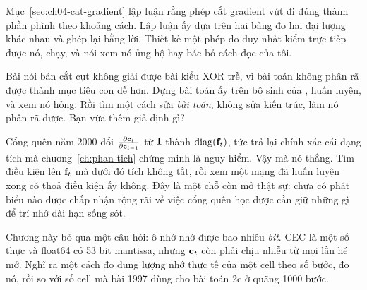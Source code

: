 \tierextend

\begin{bt}
  \item Mục~\ref{sec:ch04-cat-gradient} lập luận rằng phép cắt gradient vứt đi
    đúng thành phần phình theo khoảng cách. Lập luận ấy dựa trên hai bảng đo hai
    đại lượng khác nhau và ghép lại bằng lời. Thiết kế một phép đo duy nhất
    kiểm trực tiếp được nó, chạy, và nói xem nó ủng hộ hay bác bỏ cách đọc của
    tôi.

  \item Bài nói bản cắt cụt không giải được bài kiểu XOR trễ, vì bài toán không
    phân rã được thành mục tiêu con dễ hơn. Dựng bài toán ấy trên bộ sinh của
    , huấn luyện, và xem nó hỏng. Rồi tìm một cách sửa
    \emph{bài toán}, không sửa kiến trúc, làm nó phân rã được. Bạn vừa thêm giả
    định gì?

  \item Cổng quên năm 2000 đổi \(\frac{\partial \mathbf{c}_t}{\partial \mathbf{c}_{t-1}}\) từ
    \(\mathbf{I}\) thành \(\operatorname{diag}(\mathbf{f}_t)\), tức trả lại chính xác cái dạng
    tích mà chương~\ref{ch:phan-tich} chứng minh là nguy hiểm. Vậy mà nó thắng.
    Tìm điều kiện lên \(\mathbf{f}_t\) mà dưới đó tích không tắt, rồi xem một
    mạng đã huấn luyện xong có thoả điều kiện ấy không. Đây là một chỗ còn mở
    thật sự: chưa có phát biểu nào được chấp nhận rộng rãi về việc cổng quên
    học được cần giữ những gì để trí nhớ dài hạn sống sót.

  \item Chương này bỏ qua một câu hỏi: ô nhớ nhớ được bao nhiêu \emph{bit}.
    CEC là một số thực và float64 có 53 bit mantissa, nhưng
    \(\mathbf{c}_t\) còn phải chịu nhiễu từ mọi lần  hé
    mở. Nghĩ ra một
    cách đo dung lượng nhớ thực tế của một cell theo số bước, đo nó, rồi so với
    số cell mà bài 1997 dùng cho bài toán 2c ở quãng 1000 bước.
\end{bt}
